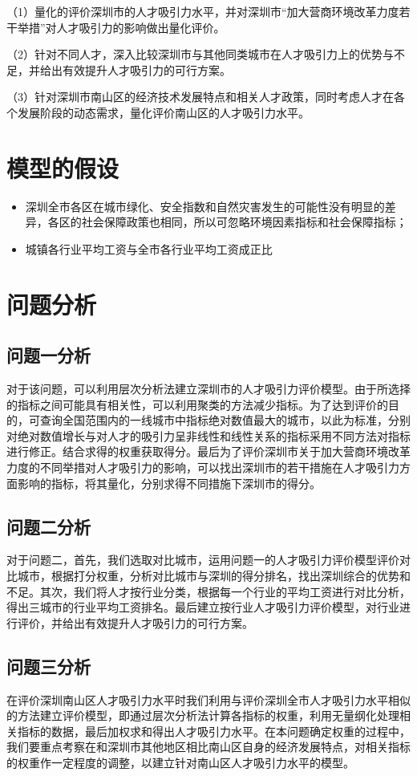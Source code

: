 \documentclass[withoutpreface,bwprint]{cumcmthesis} %
\begin{document}
（1）量化的评价深圳市的人才吸引力水平，并对深圳市“加大营商环境改革力度若干举措”对人才吸引力的影响做出量化评价。

（2）针对不同人才，深入比较深圳市与其他同类城市在人才吸引力上的优势与不足，并给出有效提升人才吸引力的可行方案。

（3）针对深圳市南山区的经济技术发展特点和相关人才政策，同时考虑人才在各个发展阶段的动态需求，量化评价南山区的人才吸引力水平。


\section{模型的假设}

\begin{itemize}
\item 深圳全市各区在城市绿化、安全指数和自然灾害发生的可能性没有明显的差异，各区的社会保障政策也相同，所以可忽略环境因素指标和社会保障指标；
\item 城镇各行业平均工资与全市各行业平均工资成正比
\end{itemize}


\section{问题分析}

\subsection{问题一分析}
对于该问题，可以利用层次分析法建立深圳市的人才吸引力评价模型。由于所选择的指标之间可能具有相关性，可以利用聚类的方法减少指标。为了达到评价的目的，可查询全国范围内的一线城市中指标绝对数值最大的城市，以此为标准，分别对绝对数值增长与对人才的吸引力呈非线性和线性关系的指标采用不同方法对指标进行修正。结合求得的权重获取得分。最后为了评价深圳市关于加大营商环境改革力度的不同举措对人才吸引力的影响，可以找出深圳市的若干措施在人才吸引力方面影响的指标，将其量化，分别求得不同措施下深圳市的得分。
\subsection{问题二分析}
对于问题二，首先，我们选取对比城市，运用问题一的人才吸引力评价模型评价对比城市，根据打分权重，分析对比城市与深圳的得分排名，找出深圳综合的优势和不足。其次，我们将人才按行业分类，根据每一个行业的平均工资进行对比分析，得出三城市的行业平均工资排名。最后建立按行业人才吸引力评价模型，对行业进行评价，并给出有效提升人才吸引力的可行方案。

\subsection{问题三分析}
在评价深圳南山区人才吸引力水平时我们利用与评价深圳全市人才吸引力水平相似的方法建立评价模型，即通过层次分析法计算各指标的权重，利用无量纲化处理相关指标的数据，最后加权求和得出人才吸引力水平。在本问题确定权重的过程中，我们要重点考察在和深圳市其他地区相比南山区自身的经济发展特点，对相关指标的权重作一定程度的调整，以建立针对南山区人才吸引力水平的模型。
\end{document}
